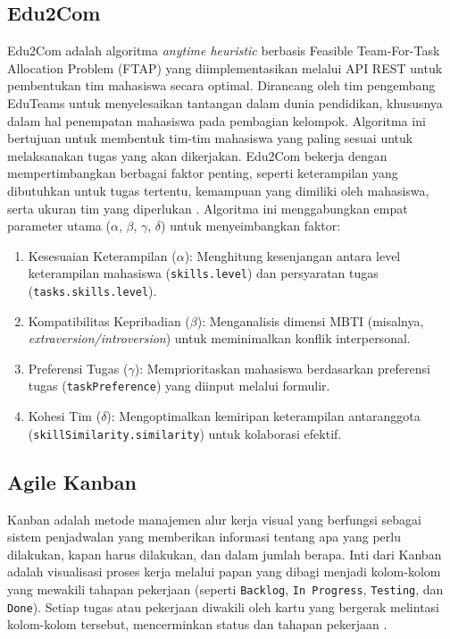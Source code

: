 \subsection{Edu2Com} \label{II.Teori5}
Edu2Com adalah algoritma \textit{anytime heuristic} berbasis Feasible Team-For-Task Allocation Problem (FTAP) yang diimplementasikan melalui API REST untuk pembentukan tim mahasiswa secara optimal. Dirancang oleh tim pengembang EduTeams untuk menyelesaikan tantangan dalam dunia pendidikan, khususnya dalam hal penempatan mahasiswa pada pembagian kelompok. Algoritma ini bertujuan untuk membentuk tim-tim mahasiswa yang paling sesuai untuk melaksanakan tugas yang akan dikerjakan. Edu2Com bekerja dengan mempertimbangkan berbagai faktor penting, seperti keterampilan yang dibutuhkan untuk tugas tertentu, kemampuan yang dimiliki oleh mahasiswa, serta ukuran tim yang diperlukan \cite{Georgara2023}. Algoritma ini menggabungkan empat parameter utama ($\alpha$, $\beta$, $\gamma$, $\delta$) untuk menyeimbangkan faktor:

\begin{enumerate}
	\item Kesesuaian Keterampilan ($\alpha$): Menghitung kesenjangan antara level keterampilan mahasiswa (\texttt{skills.level}) dan persyaratan tugas (\texttt{tasks.skills.level}).
	\item Kompatibilitas Kepribadian ($\beta$): Menganalisis dimensi MBTI (misalnya, \textit{extraversion/introversion}) untuk meminimalkan konflik interpersonal.
	\item Preferensi Tugas ($\gamma$): Memprioritaskan mahasiswa berdasarkan preferensi tugas (\texttt{taskPreference}) yang diinput melalui formulir.
	\item Kohesi Tim ($\delta$): Mengoptimalkan kemiripan keterampilan antaranggota (\texttt{skillSimilarity.similarity}) untuk kolaborasi efektif.
\end{enumerate}

\subsection{Agile Kanban} \label{II.Teori6}
Kanban adalah metode manajemen alur kerja visual yang berfungsi sebagai sistem penjadwalan yang memberikan informasi tentang apa yang perlu dilakukan, kapan harus dilakukan, dan dalam jumlah berapa. Inti dari Kanban adalah visualisasi proses kerja melalui papan yang dibagi menjadi kolom-kolom yang mewakili tahapan pekerjaan (seperti \texttt{Backlog}, \texttt{In Progress}, \texttt{Testing}, dan \texttt{Done}). Setiap tugas atau pekerjaan diwakili oleh kartu yang bergerak melintasi kolom-kolom tersebut, mencerminkan status dan tahapan pekerjaan \cite{Alaidaros2021}.

